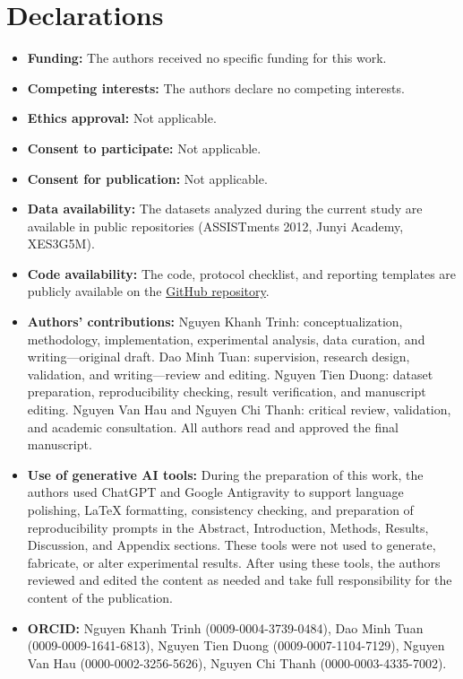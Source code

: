 \documentclass[sn-mathphys]{sn-jnl}
\begin{document}
\backmatter

\section*{Declarations}

\begin{itemize}
    \item \textbf{Funding:} The authors received no specific funding for this work.
    \item \textbf{Competing interests:} The authors declare no competing interests.
    \item \textbf{Ethics approval:} Not applicable.
    \item \textbf{Consent to participate:} Not applicable.
    \item \textbf{Consent for publication:} Not applicable.
    \item \textbf{Data availability:} The datasets analyzed during the current study are available in public repositories (ASSISTments 2012, Junyi Academy, XES3G5M).
    \item \textbf{Code availability:} The code, protocol checklist, and reporting templates are publicly available on the \href{https://github.com/trinhnkt/P0}{GitHub repository}.
    \item \textbf{Authors' contributions:} Nguyen Khanh Trinh: conceptualization, methodology, implementation, experimental analysis, data curation, and writing---original draft. Dao Minh Tuan: supervision, research design, validation, and writing---review and editing. Nguyen Tien Duong: dataset preparation, reproducibility checking, result verification, and manuscript editing. Nguyen Van Hau and Nguyen Chi Thanh: critical review, validation, and academic consultation. All authors read and approved the final manuscript.
    \item \textbf{Use of generative AI tools:} During the preparation of this work, the authors used ChatGPT and Google Antigravity to support language polishing, LaTeX formatting, consistency checking, and preparation of reproducibility prompts in the Abstract, Introduction, Methods, Results, Discussion, and Appendix sections. These tools were not used to generate, fabricate, or alter experimental results. After using these tools, the authors reviewed and edited the content as needed and take full responsibility for the content of the publication.
    \item \textbf{ORCID:} Nguyen Khanh Trinh (0009-0004-3739-0484), Dao Minh Tuan (0009-0009-1641-6813), Nguyen Tien Duong (0009-0007-1104-7129), Nguyen Van Hau (0000-0002-3256-5626), Nguyen Chi Thanh (0000-0003-4335-7002).
\end{itemize}

\clearpage
\begin{appendices}

\end{appendices}



\end{document}

